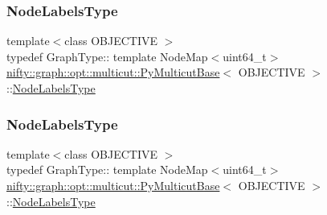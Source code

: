 \subsubsection{\texorpdfstring{Node\+Labels\+Type}{NodeLabelsType}\hspace{0.1cm}{\footnotesize\ttfamily [1/2]}}
{\footnotesize\ttfamily template$<$class O\+B\+J\+E\+C\+T\+I\+VE $>$ \\
typedef Graph\+Type\+:: template Node\+Map$<$uint64\+\_\+t$>$ \hyperlink{classnifty_1_1graph_1_1opt_1_1multicut_1_1PyMulticutBase}{nifty\+::graph\+::opt\+::multicut\+::\+Py\+Multicut\+Base}$<$ O\+B\+J\+E\+C\+T\+I\+VE $>$\+::\hyperlink{classnifty_1_1graph_1_1opt_1_1multicut_1_1PyMulticutBase_a34b9d7a58d056154c6b1abe7a83297c6}{Node\+Labels\+Type}}

\mbox{\label{classnifty_1_1graph_1_1opt_1_1multicut_1_1PyMulticutBase_a34b9d7a58d056154c6b1abe7a83297c6}} 
\subsubsection{\texorpdfstring{Node\+Labels\+Type}{NodeLabelsType}\hspace{0.1cm}{\footnotesize\ttfamily [2/2]}}
{\footnotesize\ttfamily template$<$class O\+B\+J\+E\+C\+T\+I\+VE $>$ \\
typedef Graph\+Type\+:: template Node\+Map$<$uint64\+\_\+t$>$ \hyperlink{classnifty_1_1graph_1_1opt_1_1multicut_1_1PyMulticutBase}{nifty\+::graph\+::opt\+::multicut\+::\+Py\+Multicut\+Base}$<$ O\+B\+J\+E\+C\+T\+I\+VE $>$\+::\hyperlink{classnifty_1_1graph_1_1opt_1_1multicut_1_1PyMulticutBase_a34b9d7a58d056154c6b1abe7a83297c6}{Node\+Labels\+Type}}

\mbox{\label{classnifty_1_1graph_1_1opt_1_1multicut_1_1PyMulticutBase_a434bee3be13abad62cacc5fbc4549cde}} 
